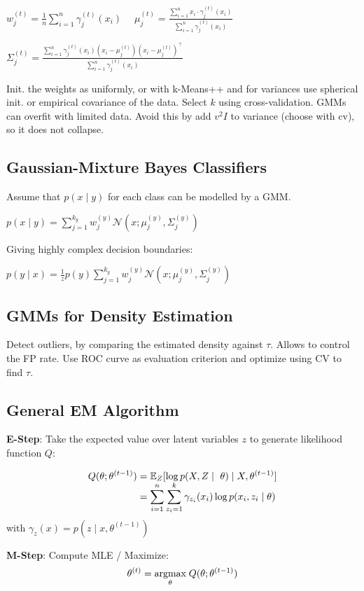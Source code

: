 $w_j^{(t)} = \frac{1}{n} \sum_{i=1}^n \gamma_j^{(t)}(x_i) \quad \; \mu_j^{(t)} = \frac{\sum_{i=1}^n x_i \cdot \gamma_j^{(t)}(x_i)}{\sum_{i=1}^n \gamma_j^{(t)}(x_i)}$

\qquad \quad $\Sigma_j^{(t)} = \frac{\sum_{i=1}^n \gamma_j^{(t)}(x_i)(x_i - \mu_j^{(t)})(x_i - \mu_j^{(t)})^\top}{\sum_{i=1}^n \gamma_j^{(t)}(x_i)}$


Init. the weights as uniformly, or with k-Means++ and for variances use spherical init. or empirical covariance of the data. Select $k$ using cross-validation. GMMs can \color{Red}overfit \color{Black} with limited data. Avoid this by add $v^2 I$ to variance (choose with cv), so it does not collapse.

\subsection*{Gaussian-Mixture Bayes Classifiers}

Assume that $p(x \; | \; y)$ for each class can be modelled by a GMM.

\qquad $p(x \; | \; y) = \sum_{j=1}^{k_y} w_j^{(y)} \mathcal{N}(x; \mu_j^{(y)}, \Sigma_j^{(y)})$

Giving highly complex decision boundaries:

\qquad $p(y \; | \; x) = \frac{1}{z} p(y)  \sum_{j=1}^{k_y} w_j^{(y)} \mathcal{N}(x; \mu_j^{(y)}, \Sigma_j^{(y)})$

\subsection*{GMMs for Density Estimation}

Detect outliers, by comparing the estimated density against $\tau$. Allows to control the FP rate. Use ROC curve as evaluation criterion and optimize using CV to find $\tau$.

\subsection*{General EM Algorithm}

\textbf{E-Step}: Take the expected value over latent variables $z$ to generate likelihood function $Q$:

\begin{align*}
	Q(\theta ; \theta^{(t-1)}) &= \E_{Z}[ \log  p(X, Z \; | \; \theta) \; | \; X, \theta^{(t-1)}] \\[-5pt]
	&= \sum_{i=1}^n \sum_{z_i=1}^k \gamma_{z_i}(x_i) \log p(x_i, z_i \; | \; \theta)
\end{align*}
with $\gamma_z(x) = p(z \; | \; x, \theta^{(t-1)})$

\textbf{M-Step}: Compute MLE / Maximize:
$$\theta^{(t)} = \underset{\theta}{\text{argmax}} \; Q(\theta; \theta^{(t-1)})$$
